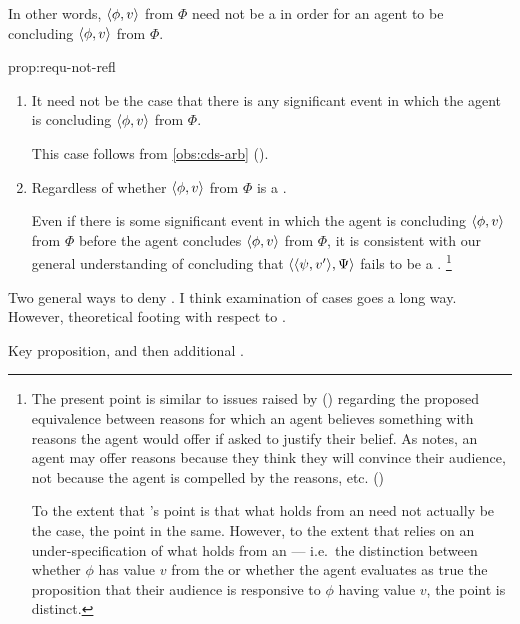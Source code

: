 \begin{note}
  In other words, \(\langle \phi, v \rangle\) from \(\Phi\) need not be a \fc{} in order for an agent to be concluding \(\langle \phi, v \rangle\) from \(\Phi\).

  \begin{argument}{prop:requ-not-refl}
    \begin{enumerate}
    \item
      It need not be the case that there is any significant event in which the agent is concluding \(\langle \phi, v \rangle\) from \(\Phi\).

      This case follows from \autoref{obs:cds-arb} ().
    \item
      Regardless of whether \(\langle \phi, v \rangle\) from \(\Phi\) is a \fc{}.

      Even if there is some significant event in which the agent is concluding \(\langle \phi, v \rangle\) from \(\Phi\) before the agent concludes \(\langle \phi, v \rangle\) from \(\Phi\), it is consistent with our general understanding of concluding that \(\langle \langle \psi, v' \rangle, \Psi \rangle\) fails to be a \requ{}.%
    \footnote{
      The present point is similar to issues raised by \citeauthor{Harman:1973ww} (\citeyear{Harman:1973ww}) regarding the proposed equivalence between reasons for which an agent believes something with reasons the agent would offer if asked to justify their belief.
      As \citeauthor{Harman:1973ww} notes, an agent may offer reasons because they think they will convince their audience, not because the agent is compelled by the reasons, etc.
      (\citeyear[Ch.2]{Harman:1973ww})

      To the extent that \citeauthor{Harman:1973ww}'s point is that what holds from an \agpe{} need not actually be the case, the point in the same.
      However, to the extent that \citeauthor{Harman:1973ww} relies on an under-specification of what holds from an \agpe{} --- i.e.\ the distinction between whether \(\phi\) has value \(v\) from the \agpe{} or whether the agent evaluates as true the proposition that their audience is responsive to \(\phi\) having value \(v\), the point is distinct.
    }
  \end{enumerate}
  \end{argument}

  Two general ways to deny .
  I think examination of cases goes a long way.
  However, theoretical footing with respect to \tC{}.

  Key proposition, and then additional .
\end{note}

